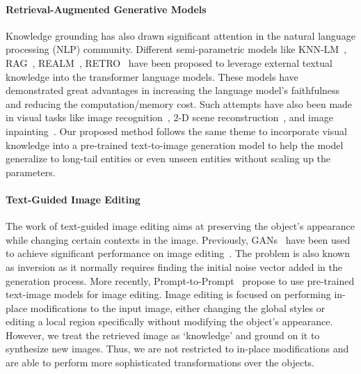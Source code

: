 \documentclass{article} \usepackage{iclr2023_conference,times}
\begin{document}
\paragraph{Retrieval-Augmented Generative Models}
Knowledge grounding has also drawn significant attention in the natural language processing (NLP) community. Different semi-parametric models like KNN-LM~\citep{khandelwal2019generalization}, RAG~\citep{lewis2020retrieval}, REALM~\citep{pmlr-v119-guu20a}, RETRO~\citep{borgeaud2021improving} have been proposed to leverage external textual knowledge into the transformer language models. These models have demonstrated great advantages in increasing the language model's faithfulness and reducing the computation/memory cost. Such attempts have also been made in visual tasks like image recognition~\citep{long2022retrieval}, 2-D scene reconstruction~\citep{siddiqui2021retrievalfuse}, and image inpainting~\citep{xu2021texture}. Our proposed method follows the same theme to incorporate visual knowledge into a pre-trained text-to-image generation model to help the model generalize to long-tail entities or even unseen entities without scaling up the parameters. 
\paragraph{Text-Guided Image Editing}
The work of text-guided image editing aims at preserving the object's appearance while changing certain contexts in the image. Previously, GANs~\citep{goodfellow2014generative} have been used to achieve significant performance on image editing~\citep{zhu2016generative,abdal2019image2stylegan,zhu2020domain,roich2021pivotal,tov2021designing,wang2022high,alaluf2022hyperstyle}. The problem is also known as inversion as it normally requires finding the initial noise vector added in the generation process. More recently, Prompt-to-Prompt~\citep{hertz2022prompt} propose to use pre-trained text-image models for image editing. Image editing is focused on performing in-place modifications to the input image, either changing the global styles or editing a local region specifically without modifying the object's appearance. However, we treat the retrieved image as `knowledge' and ground on it to synthesize new images. Thus, we are not restricted to in-place modifications and are able to perform more sophisticated transformations over the objects. 
\end{document}
